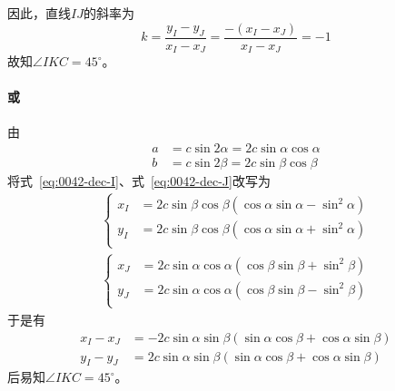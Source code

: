因此，直线$IJ$的斜率为
\[ k = \frac{y_I - y_J}{x_I - x_J} = \frac{-(x_I - x_J)}{x_I - x_J} = -1 \]
故知$\angle IKC = 45^\circ$。

\paragraph{或} 由
\begin{align*}
  a &= c\sin2\alpha = 2c\sin\alpha\cos\alpha \\
  b &= c\sin2\beta = 2c\sin\beta\cos\beta
\end{align*}
将式~\ref{eq:0042-dec-I}、式~\ref{eq:0042-dec-J}改写为
\begin{align*}
  \left\{\begin{aligned}
    x_I &= 2c\sin\beta\cos\beta(\cos\alpha\sin\alpha - \sin^2\alpha) \\
    y_I &= 2c\sin\beta\cos\beta(\cos\alpha\sin\alpha + \sin^2\alpha) \\
  \end{aligned}\right. \\
  \left\{\begin{aligned}
    x_J &= 2c\sin\alpha\cos\alpha(\cos\beta\sin\beta + \sin^2\beta) \\
    y_J &= 2c\sin\alpha\cos\alpha(\cos\beta\sin\beta - \sin^2\beta) \\
  \end{aligned}\right.
\end{align*}
于是有
\begin{align*}
  x_I - x_J &= -2c\sin\alpha\sin\beta(\sin\alpha\cos\beta + \cos\alpha\sin\beta) \\
  y_I - y_J &= 2c\sin\alpha\sin\beta(\sin\alpha\cos\beta + \cos\alpha\sin\beta)
\end{align*}
后易知$\angle IKC = 45^\circ$。
